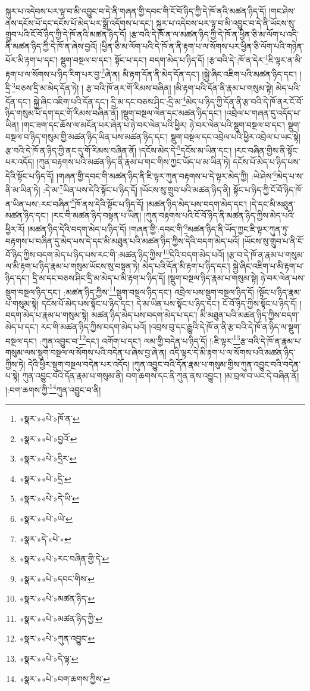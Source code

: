 སྐུར་པ་འདེབས་པར་ལྟ་བ་མི་འབྱུང་བ་དེ་ནི་གཞན་གྱི་དབང་གི་ངོ་བོ་ཉིད་ཀྱི་དེ་ཁོ་ནའི་མཚན་ཉིད་དོ། །གང་ཤེས་ནས་དངོས་པོ་དང་དངོས་པོ་མེད་པར་སྒྲོ་འདོགས་པ་དང་། སྐུར་པ་འདེབས་པར་ལྟ་བ་མི་འབྱུང་བ་དེ་ནི་ཡོངས་སུ་གྲུབ་པའི་ངོ་བོ་ཉིད་ཀྱི་དེ་ཁོ་ནའི་མཚན་ཉིད་དོ། །རྩ་བའི་དེ་ཁོ་ན་ལ་མཚན་ཉིད་ཀྱི་དེ་ཁོ་ན་ཕྱིན་ཅི་མ་ལོག་པ་འདི་ནི་མཚན་ཉིད་ཀྱི་དེ་ཁོ་ན་ཞེས་བྱའོ། །ཕྱིན་ཅི་མ་ལོག་པའི་དེ་ཁོ་ན་ནི་རྟག་པ་ལ་སོགས་པར་ཕྱིན་ཅི་ལོག་པའི་གཉེན་པོར་མི་རྟག་པ་དང་། སྡུག་བསྔལ་བ་དང་། སྟོང་པ་དང་། བདག་མེད་པ་ཉིད་དོ། །རྩ་བའི་དེ་:ཁོ་ན་དེར་\footnote{«སྣར་»«པེ་»ཁོ་ན་}ཇི་ལྟར་ན་མི་རྟག་པ་ལ་སོགས་པ་ཉིད་རིག་པར་བྱ་\footnote{«སྣར་»«པེ་»བྱའོ་}ཞེ་ན། མི་རྟག་དོན་ནི་མེད་དོན་དང་། །སྐྱེ་ཞིང་འཇིག་པའི་མཚན་ཉིད་དང་། །དྲི་\footnote{«སྣར་»«པེ་»དྲིར་}བཅས་དྲི་མ་མེད་དོན་ཏེ། །
རྩ་བའི་ཁོ་ནར་གོ་རིམས་བཞིན། །མི་རྟག་པའི་དོན་ནི་རྣམ་པ་གསུམ་སྟེ། མེད་པའི་དོན་དང་། སྐྱེ་ཞིང་འཇིག་པའི་དོན་དང་། དྲི་མ་དང་བཅས་ཤིང་:དྲི་མ་\footnote{«སྣར་»«པེ་»དྲི་}མེད་པ་ཉིད་ཀྱི་དོན་ནི་རྩ་བའི་དེ་ཁོ་ནར་ངོ་བོ་ཉིད་གསུམ་པོ་དག་དང་གོ་རིམས་བཞིན་ནོ། །སྡུག་བསྔལ་ལེན་དང་མཚན་ཉིད་དང་། །འབྲེལ་པ་གཞན་དུ་འདོད་པ་ཡིན། །གང་ཟག་དང་ཆོས་ལ་མངོན་པར་ཞེན་པ་ཉེ་བར་ལེན་པའི་ཕྱིར། ཉེ་བར་ལེན་པའི་སྡུག་བསྔལ་བ་དང་། སྡུག་བསྔལ་བ་ཉིད་གསུམ་གྱི་མཚན་ཉིད་ཡིན་པས་མཚན་ཉིད་དང་། སྡུག་བསྔལ་དང་འབྲེལ་པའི་ཕྱིར་འབྲེལ་པ་ཡང་སྟེ། རྩ་བའི་དེ་ཁོ་ན་ཉིད་ཀྱི་ནང་དུ་གོ་རིམས་བཞིན་ནོ། །དངོས་མེད་དེ་\footnote{«སྣར་»«པེ་»དེ་ཡི་}དངོས་མ་ཡིན་དང་། །རང་བཞིན་གྱིས་ནི་སྟོང་པར་འདོད། །ཀུན་བརྟགས་པའི་མཚན་ཉིད་ནི་རྣམ་པ་གང་གིས་ཀྱང་ཡོད་པ་མ་ཡིན་ཏེ། དངོས་པོ་མེད་པ་ཉིད་པས་དེའི་སྟོང་པ་ཉིད་དོ། །གཞན་གྱི་དབང་གི་མཚན་ཉིད་ནི་ཇི་ལྟར་ཀུན་བརྟགས་པ་དེ་ལྟར་མེད་ཀྱི། :ཡེ་ཤེས་\footnote{«སྣར་»«པེ་»ཡེ་}མེད་པ་ས་ནི་མ་ཡིན་ཏེ། :དེ་མ་\footnote{«སྣར་»དེ་«པེ་»}ཡིན་པས་དེའི་སྟོང་པ་ཉིད་དོ། །ཡོངས་སུ་གྲུབ་པའི་མཚན་ཉིད་ནི། སྟོང་པ་ཉིད་ཀྱི་ངོ་བོ་ཉིད་ཁོ་ན་ཡིན་པས་:རང་བཞིན་\footnote{«སྣར་»«པེ་»རང་བཞིན་གྱི་དེ་}ཁོ་ནས་དེའི་སྟོང་པ་ཉིད་དོ། །མཚན་ཉིད་མེད་པས་བདག་མེད་དང་། །དེ་དང་མི་མཐུན་མཚན་ཉིད་དང་། །རང་གི་མཚན་ཉིད་བསྟན་པ་ཡིན། །ཀུན་བརྟགས་པའི་ངོ་བོ་ཉིད་ནི་མཚན་ཉིད་ཀྱིས་མེད་པའི་ཕྱིར་རོ། །མཚན་ཉིད་དེའི་བདག་མེད་པ་ཉིད་དོ། །གཞན་གྱི་:དབང་གི་\footnote{«སྣར་»«པེ་»དབང་གིས་}མཚན་ཉིད་ནི་ཡོད་ཀྱང་ཇི་ལྟར་ཀུན་ཏུ་བརྟགས་པ་བཞིན་དུ་མེད་པས་དེ་དང་མི་མཐུན་པའི་མཚན་ཉིད་ཀྱིས་དེའི་བདག་མེད་པའོ། །ཡོངས་སུ་གྲུབ་པ་ནི་ངོ་བོ་ཉིད་ཀྱིས་བདག་མེད་པ་ཉིད་པས་རང་གི་:མཚན་ཉིད་ཀྱིས་\footnote{«སྣར་»«པེ་»མཚན་ཉིད་}དེའི་བདག་མེད་པའོ། །རྩ་བ་དེ་ཁོ་ན་རྣམ་པ་གསུམ་ལ་མི་རྟག་པ་ཉིད་རྣམ་པ་གསུམ་ཡོངས་སུ་བསྟན་ཏེ། མེད་པའི་དོན་མི་རྟག་པ་ཉིད་དང་། སྐྱེ་ཞིང་འཇིག་པ་མི་རྟག་པ་ཉིད་དང་། དྲི་མ་དང་བཅས་ཤིང་དྲི་མ་མེད་པ་མི་རྟག་པ་ཉིད་དོ། །སྡུག་བསྔལ་ཉིད་རྣམ་པ་གསུམ་སྟེ། ཉེ་བར་ལེན་པས་སྡུག་བསྔལ་ཉིད་དང་། :མཚན་ཉིད་ཀྱིས་\footnote{«སྣར་»«པེ་»མཚན་ཉིད་ཀྱི་}སྡུག་བསྔལ་ཉིད་དང་། འབྲེལ་པས་སྡུག་བསྔལ་ཉིད་དོ། །སྟོང་པ་ཉིད་རྣམ་པ་གསུམ་སྟེ། དངོས་པོ་མེད་པས་སྟོང་པ་ཉིད་དང་། དེ་མ་ཡིན་པས་སྟོང་པ་ཉིད་དང་། ངོ་བོ་ཉིད་ཀྱིས་སྟོང་པ་ཉིད་དོ། །བདག་མེད་པ་རྣམ་པ་གསུམ་སྟེ། མཚན་ཉིད་མེད་པས་བདག་མེད་པ་དང་། མི་མཐུན་པའི་མཚན་ཉིད་ཀྱིས་བདག་མེད་པ་དང་། རང་གི་མཚན་ཉིད་ཀྱིས་བདག་མེད་པའོ། །འབྲས་བུ་དང་རྒྱུའི་དེ་ཁོ་ན་ནི་རྩ་བའི་དེ་ཁོ་ན་ཉིད་ལ་སྡུག་བསྔལ་དང་། :ཀུན་འབྱུང་བ་\footnote{«སྣར་»«པེ་»ཀུན་འབྱུང་}དང་། འགོག་པ་དང་། ལམ་གྱི་བདེན་པ་ཉིད་དོ། །:ཇི་ལྟར་\footnote{«སྣར་»«པེ་»དེ་ལྟ་}རྩ་བའི་དེ་ཁོ་ན་རྣམ་པ་གསུམ་ལས་སྡུག་བསྔལ་ལ་སོགས་པའི་བདེན་པ་ཞེས་བྱ་ཞེ་ན། འདི་ལྟར་དེ་མི་རྟག་པ་ལ་སོགས་པའི་མཚན་ཉིད་ཀྱིས་ཏེ། དེའི་ཕྱིར་སྡུག་བསྔལ་བདེན་པར་འདོད། །ཀུན་འབྱུང་བའི་དོན་རྣམ་པ་གསུམ་གྱིས་ཀུན་འབྱུང་བའི་བདེན་པ་སྟེ། ཀུན་འབྱུང་བའི་དོན་རྣམ་པ་གསུམ་ནི། བག་ཆགས་དང་ནི་ཀུན་ནས་འབྱུང་། །མ་བྲལ་བ་ཡང་དེ་བཞིན་ནོ། །:བག་ཆགས་ཀྱི་\footnote{«སྣར་»«པེ་»བག་ཆགས་ཀྱིས་}ཀུན་འབྱུང་བ་ནི། 
